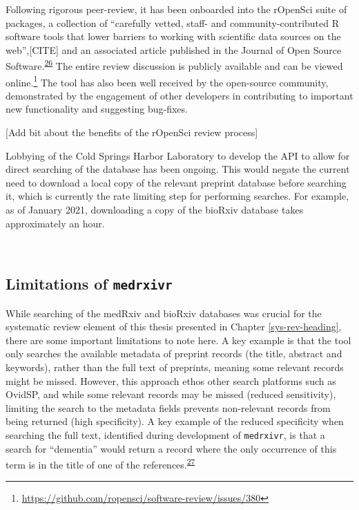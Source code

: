 \documentclass[a4paper, twoside]{templates/ociamthesis}
\begin{document}
Following rigorous peer-review, it has been onboarded into the rOpenSci suite of packages, a collection of ``carefully vetted, staff- and community-contributed R software tools that lower barriers to working with scientific data sources on the web'',{[}CITE{]} and an associated article published in the Journal of Open Source Software.\textsuperscript{\protect\hyperlink{ref-mcguinness2020a}{26}} The entire review discussion is publicly available and can be viewed online.\footnote{\url{https://github.com/ropensci/software-review/issues/380}} The tool has also been well received by the open-source community, demonstrated by the engagement of other developers in contributing to important new functionality and suggesting bug-fixes.

{[}Add bit about the benefits of the rOpenSci review process{]}

Lobbying of the Cold Springs Harbor Laboratory to develop the API to allow for direct searching of the database has been ongoing. This would negate the current need to download a local copy of the relevant preprint database before searching it, which is currently the rate limiting step for performing searches. For example, as of January 2021, downloading a copy of the bioRxiv database takes approximately an hour.

~

\hypertarget{limitations-of-medrxivr}{%
\subsection{\texorpdfstring{Limitations of \texttt{medrxivr}}{Limitations of medrxivr}}\label{limitations-of-medrxivr}}

While searching of the medRxiv and bioRxiv databases was crucial for the systematic review element of this thesis presented in Chapter \ref{sys-rev-heading}, there are some important limitations to note here. A key example is that the tool only searches the available metadata of preprint records (the title, abstract and keywords), rather than the full text of preprints, meaning some relevant records might be missed. However, this approach ethos other search platforms such as OvidSP, and while some relevant records may be missed (reduced sensitivity), limiting the search to the metadata fields prevents non-relevant records from being returned (high specificity). A key example of the reduced specificity when searching the full text, identified during development of \texttt{medrxivr}, is that a search for ``dementia'' would return a record where the only occurrence of this term is in the title of one of the references.\textsuperscript{\protect\hyperlink{ref-bong2019}{27}}
\end{document}
